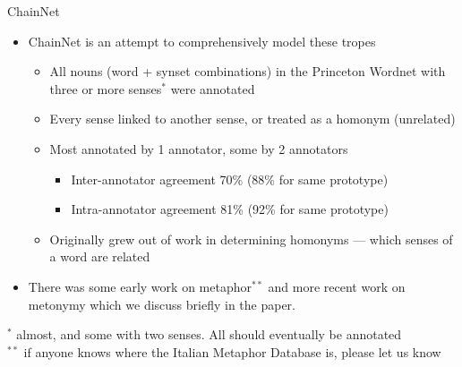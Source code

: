 \documentclass[dvipsnames]{beamer}
\begin{document}
\begin{frame}{ChainNet}

  \begin{itemize}
  \item ChainNet is an attempt to comprehensively model these tropes \citep{maudslay-etal-2024-chainnet-structured,Bond:Maudslay:2025}
    \begin{itemize}
    \item All nouns (word + synset combinations) in the
      Princeton Wordnet \citep{_Fellbaum:1998} with three or more senses$^*$
      were annotated
  \item Every sense linked to another sense, or treated as a homonym (unrelated) 
  \item Most annotated by 1 annotator, some by 2 annotators
    \begin{itemize}
    \item Inter-annotator agreement 70\% (88\% for same prototype)
    \item Intra-annotator agreement 81\% (92\% for same prototype)
    \end{itemize}
  \item Originally grew out of work in determining homonyms --- which senses of a word are related
  \end{itemize}
  \item There was some early work on metaphor$^{**}$  \citep{alonge-2006-italian} and more recent work on metonymy \citep{khishigsuren_bella_brochhagen_marav_giunchiglia_batsuren_2022} which we discuss briefly  in the paper.

\end{itemize}

\begin{small}
 $^*$ almost, and some with two senses.   All should eventually be annotated \\
$^{**}$ if anyone knows where the Italian Metaphor Database is, please let us know
\end{small}
\end{frame}
\end{document}
